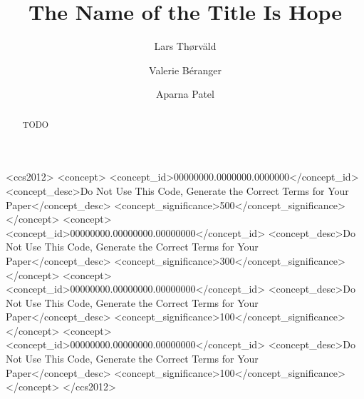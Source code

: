 \documentclass[sigconf]{acmart}
\begin{document}
\title{The Name of the Title Is Hope}

\author{Lars Th{\o}rv{\"a}ld}

\author{Valerie B\'eranger}

\author{Aparna Patel}

\renewcommand{\shortauthors}{Trovato et al.}

\begin{abstract}
  TODO
\end{abstract}

\begin{CCSXML}
  <ccs2012>
  <concept>
  <concept_id>00000000.0000000.0000000</concept_id>
  <concept_desc>Do Not Use This Code, Generate the Correct Terms for Your Paper</concept_desc>
  <concept_significance>500</concept_significance>
  </concept>
  <concept>
  <concept_id>00000000.00000000.00000000</concept_id>
  <concept_desc>Do Not Use This Code, Generate the Correct Terms for Your Paper</concept_desc>
  <concept_significance>300</concept_significance>
  </concept>
  <concept>
  <concept_id>00000000.00000000.00000000</concept_id>
  <concept_desc>Do Not Use This Code, Generate the Correct Terms for Your Paper</concept_desc>
  <concept_significance>100</concept_significance>
  </concept>
  <concept>
  <concept_id>00000000.00000000.00000000</concept_id>
  <concept_desc>Do Not Use This Code, Generate the Correct Terms for Your Paper</concept_desc>
  <concept_significance>100</concept_significance>
  </concept>
  </ccs2012>
\end{CCSXML}




\maketitle
\end{document}
